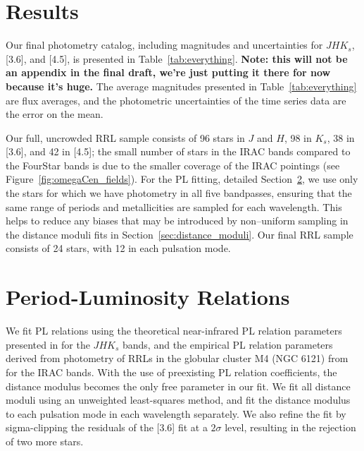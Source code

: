 \documentclass[a4paper,fleqn,usenatbib]{mnras}
\providecommand{\vscomment}[1]{{\textcolor{magenta}{{VS: #1}}}\xspace}
\begin{document}
\section{Results}
\label{sec:results}

Our final photometry catalog, including magnitudes and uncertainties for $J\!H\!K_s$, [3.6], and [4.5], is presented in Table~\ref{tab:everything}. {\bf Note: this will not be an appendix in the final draft, we're just putting it there for now because it's huge.}
The average magnitudes presented in Table~\ref{tab:everything} are flux averages, and the photometric uncertainties of the time series data are the error on the mean. %

Our full, uncrowded RRL sample consists of 96 stars in $J$ and $H$, 98 in $K_s$, 38 in [3.6], and 42 in [4.5]; the small number of stars in the IRAC bands compared to the FourStar bands is due to the smaller coverage of the IRAC pointings (see Figure~\ref{fig:omegaCen_fields}). For the PL fitting, detailed Section~\ref{sec:pl_relation}, we use only the stars for which we have photometry in all five bandpasses, ensuring that the same range of periods and metallicities are sampled for each wavelength. This helps to reduce any biases that may be introduced by non--uniform sampling in the distance moduli fits in Section~\ref{sec:distance_moduli}. Our final RRL sample consists of 24 stars, with 12 in each pulsation mode.

\section{Period-Luminosity Relations}
\label{sec:pl_relation}

We fit PL relations using the theoretical near-infrared PL relation parameters presented in \citet{2015ApJ...808...50M} for the $JHK_s$ bands, and the empirical PL relation parameters derived from photometry of RRLs in the globular cluster M4 (NGC 6121) from \citet{2015ApJ...808...11N} for the IRAC bands. With the use of preexisting PL relation coefficients, the distance modulus becomes the only free parameter in our fit. We fit all distance moduli using an unweighted least-squares method, and fit the distance modulus to each pulsation mode in each wavelength separately. We also refine the fit by sigma-clipping the residuals of the [3.6] fit at a $2\sigma$ level, resulting in the rejection of two more stars.
\end{document}
